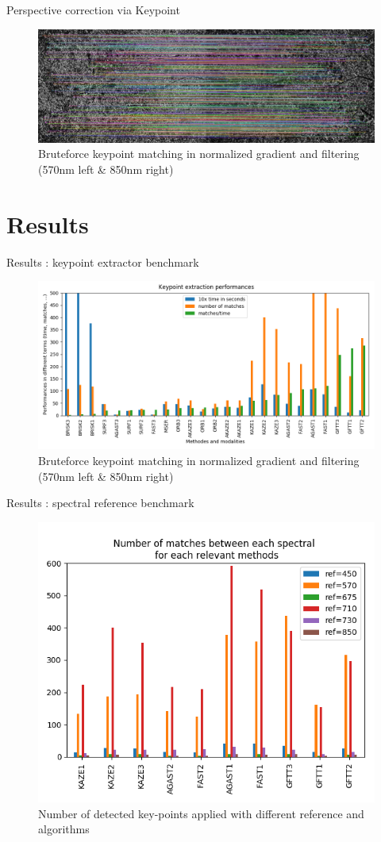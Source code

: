 \documentclass{beamer}
\begin{document}
		\begin{frame}{Perspective correction via Keypoint}
			\begin{figure}
				\includegraphics[width=\linewidth]{../figures/prespective-feature-matching}
				\caption{Bruteforce keypoint matching in normalized gradient and filtering (570nm left \& 850nm right)}
			\end{figure}
		\end{frame}
	
	\section{Results}
	
		\begin{frame}{Results : keypoint extractor benchmark}
			\begin{figure}
				\includegraphics[width=0.8\linewidth]{../figures/comparaison-keypoint-performances}
				\caption{Bruteforce keypoint matching in normalized gradient and filtering (570nm left \& 850nm right)}
			\end{figure}
		\end{frame}
	
		\begin{frame}{Results : spectral reference benchmark}
			\begin{figure}
				\includegraphics[width=0.6\linewidth]{../figures/comparaison-keypoint-matching-reference-merged.png}
				\caption{Number of detected key-points applied with different reference and algorithms}
			\end{figure}
		\end{frame}
	
\end{document}
